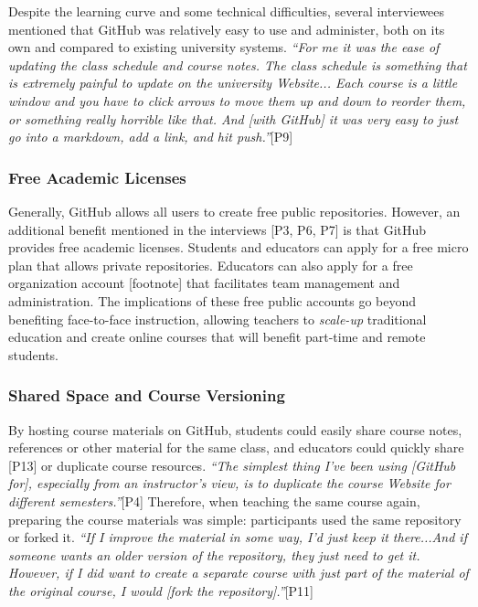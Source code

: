 Despite the learning curve and some technical difficulties, several interviewees mentioned that GitHub was relatively easy to use and administer, both on its own and compared to existing university systems. \textit{``For me it was the ease of updating the class schedule and course notes. The class schedule is something that is extremely painful to update on the university Website... Each course is a little window and you have to click arrows to move them up and down to reorder them, or something really horrible like that. And [with GitHub] it was very easy to just go into a markdown, add a link, and hit push.''}[P9]

\subsubsection{Free Academic Licenses}

Generally, GitHub allows all users to create free public repositories. However, an additional benefit mentioned in the interviews [P3, P6, P7] is that GitHub provides free academic licenses. Students and educators can apply for a free micro plan that allows private repositories. Educators can also apply for a free organization account [footnote] that facilitates team management and administration. The implications of these free public accounts go beyond benefiting face-to-face instruction, allowing teachers to \textit{scale-up} traditional education and create online courses that will benefit part-time and remote students.

\subsubsection{Shared Space and Course Versioning}
By hosting course materials on GitHub, students could easily share course notes, references or other material for the same class, and educators could quickly share [P13] or duplicate course resources. \textit{``The simplest thing I've been using [GitHub for], especially from an instructor's view, is to duplicate the course Website for different semesters.''}[P4] Therefore, when teaching the same course again, preparing the course materials was simple: participants used the same repository or forked it. \textit{``If I improve the material in some way, I'd just keep it there...And if someone wants an older version of the repository, they just need to get it. However, if I did want to create a separate course with just part of the material of the original course, I would [fork the repository].''}[P11]

